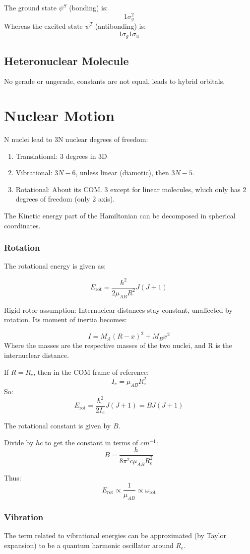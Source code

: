 \documentclass[12pt]{article}
\begin{document}
The ground state $\psi^S$ (bonding) is:
\[1\sigma_g^2\]
Whereas the excited state $\psi^T$ (antibonding) is:
\[1\sigma_g1\sigma_u\]

\subsection{Heteronuclear Molecule}
No gerade or ungerade, constants are not equal, leads to hybrid orbitals.

\section{Nuclear Motion}
N nuclei lead to 3N nuclear degrees of freedom:
\begin{enumerate}
    \item Translational: 3 degrees in 3D
    \item Vibrational: $3N-6$, unless linear (diamotic), then $3N-5$.
    \item Rotational: About its COM. 3 except for linear molecules, which only has 2 degrees of freedom (only 2 axis).
\end{enumerate}


The Kinetic energy part of the Hamiltonian can be decomposed in spherical coordinates. 

\subsubsection{Rotation}
The rotational energy is given as:

\[E_\text{rot} = \frac{\hbar^2}{2\mu_{AB}R^2} J(J+1)\]

Rigid rotor assumption: Internuclear distances stay constant, unaffected by rotation. Its moment of inertia becomes:

\[ I = M_A(R-x)^2+M_Bx^2\]
Where the masses are the respective masses of the two nuclei, and R is the internuclear distance. 

If $R=R_e$, then in the COM frame of reference:
\[I_e = \mu_{AB}R^2_e\]
So:
\[E_\text{rot} = \frac{\hbar^2}{2I_e}J(J+1) = BJ(J+1)\]

The rotational constant is given by $B$.

Divide by $hc$ to get the constant in terms of $cm^{-1}$:
\[ B = \frac{h}{8\pi^2c\mu_{AB}R^2_e}\]

Thus:
\[ E_\text{rot} \propto \frac{1}{\mu_{AB}} \propto \omega_\text{rot}\]

\subsubsection{Vibration}
The term related to vibrational energies can be approximated (by Taylor expansion) to be a quantum harmonic oscillator around $R_e$. 
\end{document}
